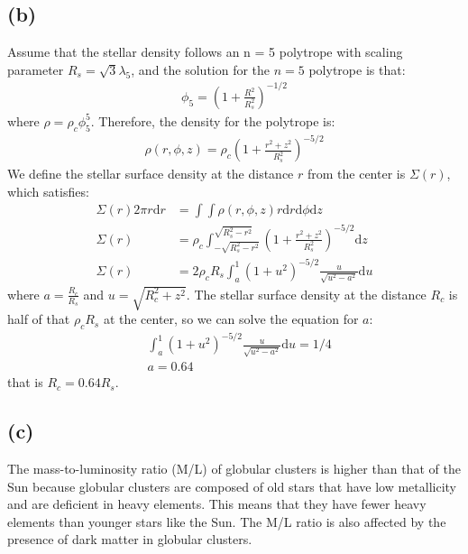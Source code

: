 \documentclass[a4paper,12pt]{article}
\renewcommand{\d}{\mathrm{d}}
\begin{document}
\subsection*{(b)}
Assume that the stellar density follows an n = 5 polytrope with scaling parameter $R_s=\sqrt{3}\lambda_5$, and the 
solution for the $n=5$ polytrope is that:
\begin{align*}
    \phi_5 = (1 + \frac{R^2}{R_s^2})^{-1/2}
\end{align*}
where $\rho  = \rho_c \phi_5^5$. Therefore, the density for the polytrope is:
\begin{align*}
    \rho(r, \phi , z) = \rho_c (1 + \frac{r^2 + z^2}{R_s^2})^{-5/2}
\end{align*}
We define the stellar surface density at the distance $r$ from the center is $\Sigma(r)$, which 
satisfies:
\begin{align*}
    \Sigma(r) 2\pi r \d r &= \int \int \rho(r, \phi, z) r\d r \d \phi \d z \\
    \Sigma(r) &= \rho_c \int_{-\sqrt{R_s^2-r^2}}^{\sqrt{R_s^2-r^2}} (1 + \frac{r^2 + z^2}{R_s^2})^{-5/2} \d z \\
    \Sigma(r) &= 2\rho_c R_s \int_{a}^{1} (1+u^2)^{-5/2} \frac{u}{\sqrt{u^2 - a^2}} \d u
\end{align*}
where $a = \frac{R_c}{R_s}$ and $u = \sqrt{R_c^2 + z^2}$.
The stellar surface density at the distance $R_c$ is half of that $\rho_c R_s$ at the center, so we can solve the 
equation for $a$:
\begin{align*}
    &\int_{a}^{1}(1+u^2)^{-5/2} \frac{u}{\sqrt{u^2 - a^2}} \d u = 1/4 \\
    &a = 0.64
\end{align*}
that is $R_c=0.64R_s$.

\subsection*{(c)}
The mass-to-luminosity ratio (M/L) of globular clusters is higher than that of the Sun 
because globular clusters are composed of old stars that have low metallicity and are deficient in heavy elements. 
This means that they have fewer heavy elements than younger stars like the Sun. 
The M/L ratio is also affected by the presence of dark matter in globular clusters.
\end{document}
